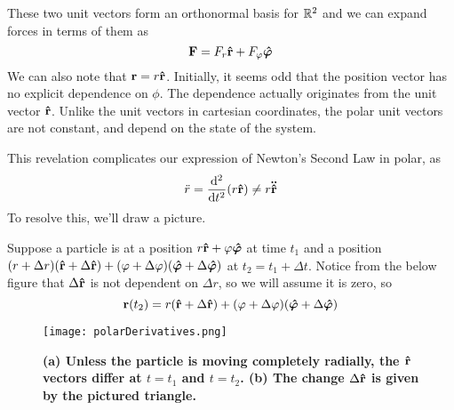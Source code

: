 These two unit vectors form an orthonormal basis for $\mathbb{R}^2$ and we can expand forces in terms of them as
\[ \mathbf{F} = F_r\mathbf{\hat{r}} + F_\varphi \bm{\hat{\varphi}}\]
We can also note that $\mathbf{r} = r\mathbf{\hat{r}}$. Initially, it seems odd that the position vector has no explicit dependence on $\phi$. The dependence actually originates from the unit vector $\mathbf{\hat{r}}$. Unlike the unit vectors in cartesian coordinates, the polar unit vectors are not constant, and depend on the state of the system. 

This revelation complicates our expression of Newton's Second Law in polar, as 
\[ \ddot r = \dv[2]{t}(r\mathbf{\hat{r}}) \neq r\mathbf{\ddot{\hat r}}\]
To resolve this, we'll draw a picture.

Suppose a particle is at a position $r\mathbf{\hat{r}} + \varphi\bm{\hat{\varphi}}$ at time $t_1$ and a position $(r + \Delta r)(\mathbf{\hat{r}} + \Delta\mathbf{\hat{r}}) + (\varphi + \Delta \varphi)(\bm{\hat{\varphi}} + \Delta\bm{\hat{\varphi}})$ at $t_2 = t_1 + \Delta t$. Notice from the below figure that $\Delta \mathbf{\hat{r}}$ is not dependent on $\Delta r$, so we will assume it is zero, so
\[ \mathbf{r}(t_2) = r(\mathbf{\hat{r}} + \Delta \mathbf{\hat{r}}) + (\varphi + \Delta \varphi)(\bm{\hat{\varphi}} + \Delta \bm{\hat{\varphi}})\]
\begin{figure}[h!]
    \centering
    \texttt{[image: polarDerivatives.png]}
    \caption{\bf{(a)} Unless the particle is moving completely radially, the $\mathbf{\hat{r}}$ vectors differ at $t=t_1$ and $t=t_2$. \bf{(b)} The change $\Delta \mathbf{\hat{r}}$ is given by the pictured triangle.}
    \label{fig:polarDerivatives}
\end{figure}

